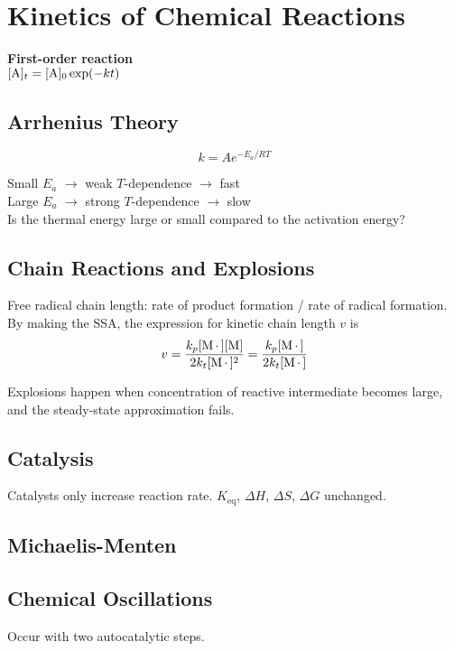 \columnbreak
\section{Kinetics of Chemical Reactions}

\textbf{First-order reaction} \\
 $[\ce{A}]_t = [\ce{A}]_0 \exp (-kt)$
\vspace{\baselineskip}

\subsection*{Arrhenius Theory}

\begin{equation*}
    k = Ae^{-E_a/RT}
\end{equation*}

Small $E_a$ $\rightarrow$ weak $T$-dependence $\rightarrow$ fast \\
Large $E_a$ $\rightarrow$ strong $T$-dependence $\rightarrow$ slow \\
Is the thermal energy large or small compared to the activation energy?

\subsection*{Chain Reactions and Explosions}
Free radical chain length: rate of product formation / rate of radical formation. By making the SSA, the expression for kinetic chain length $v$ is
\begin{equation*}
    v = \frac{k_p [\ce{M.}][\ce{M}]}{2k_t[\ce{M.}]^2} = \frac{k_p[\ce{M.}]}{2k_t[\ce{M.}]}
\end{equation*}

Explosions happen when concentration of reactive intermediate becomes large, and the
steady-state approximation fails.

\subsection*{Catalysis}
Catalysts only increase reaction rate. $K_{\mathrm{eq}}$, $\Delta H$, $\Delta S$, $\Delta G$ unchanged.

\subsection*{Michaelis-Menten}

\subsection*{Chemical Oscillations}
Occur with two autocatalytic steps.